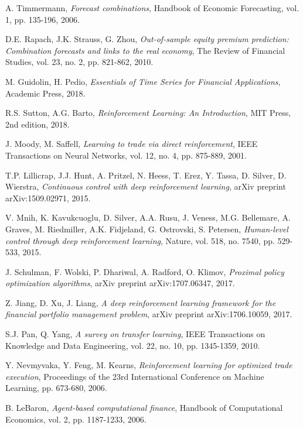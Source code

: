 \documentclass[10pt,twocolumn]{article}
\begin{document}
\begin{thebibliography}{35}
A. Timmermann,
\textit{Forecast combinations},
Handbook of Economic Forecasting, vol. 1, pp. 135-196, 2006.

D.E. Rapach, J.K. Strauss, G. Zhou,
\textit{Out-of-sample equity premium prediction: Combination forecasts and links to the real economy},
The Review of Financial Studies, vol. 23, no. 2, pp. 821-862, 2010.

M. Guidolin, H. Pedio,
\textit{Essentials of Time Series for Financial Applications},
Academic Press, 2018.

R.S. Sutton, A.G. Barto,
\textit{Reinforcement Learning: An Introduction},
MIT Press, 2nd edition, 2018.

J. Moody, M. Saffell,
\textit{Learning to trade via direct reinforcement},
IEEE Transactions on Neural Networks, vol. 12, no. 4, pp. 875-889, 2001.

T.P. Lillicrap, J.J. Hunt, A. Pritzel, N. Heess, T. Erez, Y. Tassa, D. Silver, D. Wierstra,
\textit{Continuous control with deep reinforcement learning},
arXiv preprint arXiv:1509.02971, 2015.

V. Mnih, K. Kavukcuoglu, D. Silver, A.A. Rusu, J. Veness, M.G. Bellemare, A. Graves, M. Riedmiller, A.K. Fidjeland, G. Ostrovski, S. Petersen,
\textit{Human-level control through deep reinforcement learning},
Nature, vol. 518, no. 7540, pp. 529-533, 2015.

J. Schulman, F. Wolski, P. Dhariwal, A. Radford, O. Klimov,
\textit{Proximal policy optimization algorithms},
arXiv preprint arXiv:1707.06347, 2017.

Z. Jiang, D. Xu, J. Liang,
\textit{A deep reinforcement learning framework for the financial portfolio management problem},
arXiv preprint arXiv:1706.10059, 2017.

S.J. Pan, Q. Yang,
\textit{A survey on transfer learning},
IEEE Transactions on Knowledge and Data Engineering, vol. 22, no. 10, pp. 1345-1359, 2010.

Y. Nevmyvaka, Y. Feng, M. Kearns,
\textit{Reinforcement learning for optimized trade execution},
Proceedings of the 23rd International Conference on Machine Learning, pp. 673-680, 2006.

B. LeBaron,
\textit{Agent-based computational finance},
Handbook of Computational Economics, vol. 2, pp. 1187-1233, 2006.

\end{thebibliography}
\end{document}

